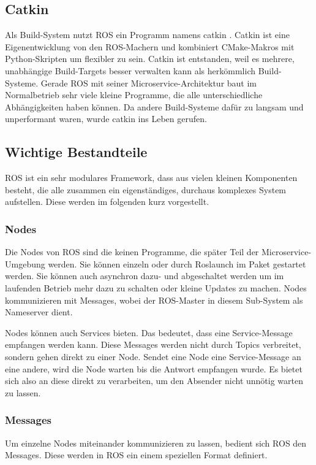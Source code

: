 \subsection*{Catkin}

Als Build-System nutzt \ac{ROS} ein Programm namens catkin \cite{ROS_CATKIN}. Catkin ist eine Eigenentwicklung von den \ac{ROS}-Machern und kombiniert CMake-Makros mit Python-Skripten um flexibler zu sein. Catkin ist entstanden, weil es mehrere, unabhängige Build-Targets besser verwalten kann als herkömmlich Build-Systeme. Gerade \ac{ROS} mit seiner Microservice-Architektur baut im Normalbetrieb sehr viele kleine Programme, die alle unterschiedliche Abhängigkeiten haben können. Da andere Build-Systeme dafür zu langsam und unperformant waren, wurde catkin ins Leben gerufen.

\subsection*{Wichtige Bestandteile}

\ac{ROS} ist ein sehr modulares Framework, dass aus vielen kleinen Komponenten besteht, die alle zusammen ein eigenständiges, durchaus komplexes System aufstellen. Diese werden im folgenden kurz vorgestellt.

\subsubsection*{Nodes}
Die Nodes von \ac{ROS} sind die keinen Programme, die später Teil der Microservice-Umgebung werden\cite{ROS_NODES}. Sie können einzeln oder durch Roslaunch im Paket gestartet werden. Sie können auch asynchron dazu- und abgeschaltet werden um im laufenden Betrieb mehr dazu zu schalten oder kleine Updates zu machen. Nodes kommunizieren mit Messages, wobei der \ac{ROS}-Master in diesem Sub-System als Nameserver dient.

Nodes können auch Services bieten. Das bedeutet, dass eine Service-Message empfangen werden kann. Diese Messages werden nicht durch Topics verbreitet, sondern gehen direkt zu einer Node. Sendet eine Node eine Service-Message an eine andere, wird die Node warten bis die Antwort empfangen wurde. Es bietet sich also an diese direkt zu verarbeiten, um den Absender nicht unnötig warten zu lassen.

\subsubsection*{Messages}
Um einzelne Nodes miteinander kommunizieren zu lassen, bedient sich \ac{ROS} den Messages\cite{ROS_SLAM}. Diese werden in \ac{ROS} ein einem speziellen Format definiert.


